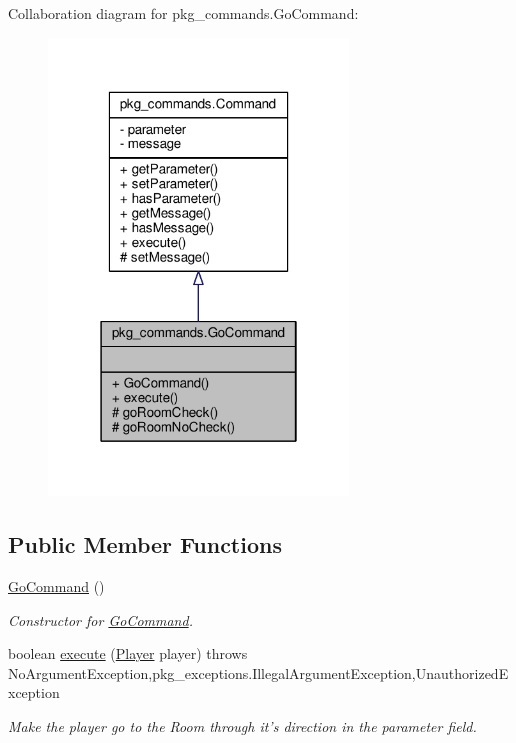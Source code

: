 Collaboration diagram for pkg\-\_\-commands.\-Go\-Command\-:\nopagebreak
\begin{figure}[H]
\begin{center}
\leavevmode
\includegraphics[width=226pt]{classpkg__commands_1_1GoCommand__coll__graph}
\end{center}
\end{figure}
\subsection*{Public Member Functions}
\begin{DoxyCompactItemize}
\item 
\hyperlink{classpkg__commands_1_1GoCommand_af87b7ac858440df2c3d850c89441f4c7}{Go\-Command} ()
\begin{DoxyCompactList}\small\item\em Constructor for \hyperlink{classpkg__commands_1_1GoCommand}{Go\-Command}. \end{DoxyCompactList}\item 
boolean \hyperlink{classpkg__commands_1_1GoCommand_a82e9a64a0fac612f788060a90c83f9b1}{execute} (\hyperlink{classpkg__world_1_1Player}{Player} player)  throws No\-Argument\-Exception,pkg\-\_\-exceptions.\-Illegal\-Argument\-Exception,\-Unauthorized\-Exception 
\begin{DoxyCompactList}\small\item\em Make the player go to the Room through it's direction in the parameter field. \end{DoxyCompactList}\end{DoxyCompactItemize}
